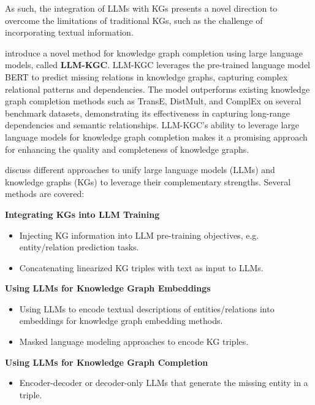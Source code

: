 \documentclass{article}
\begin{document}
As such, the integration of LLMs with KGs presents a novel direction to
overcome the limitations of traditional KGs, such as the challenge of
incorporating textual information.

\textbf{\cite{ullah2021llm-kgc}} introduce a novel method for knowledge graph
completion using large language models, called \textbf{LLM-KGC}. LLM-KGC
leverages the pre-trained language model BERT to predict missing relations in
knowledge graphs, capturing complex relational patterns and dependencies. The
model outperforms existing knowledge graph completion methods such as TransE,
DistMult, and ComplEx on several benchmark datasets, demonstrating its
effectiveness in capturing long-range dependencies and semantic relationships.
LLM-KGC's ability to leverage large language models for knowledge graph
completion makes it a promising approach for enhancing the quality and
completeness of knowledge graphs.

\textbf{\cite{pan2023unifying}} discuss different approaches to unify large
language models (LLMs) and knowledge graphs (KGs) to leverage their
complementary strengths. Several methods are covered:


\textbf{Integrating KGs into LLM Training}
\begin{itemize}
      \item Injecting KG information into LLM pre-training objectives, e.g.
            entity/relation prediction tasks.
      \item Concatenating linearized KG triples with text as input to LLMs.
\end{itemize}

\textbf{Using LLMs for Knowledge Graph Embeddings}
\begin{itemize}
      \item Using LLMs to encode textual descriptions of entities/relations
            into
            embeddings for knowledge graph embedding methods.
      \item Masked language modeling approaches to encode KG triples.
\end{itemize}

\textbf{Using LLMs for Knowledge Graph Completion}
\begin{itemize}
      \item Encoder-decoder or decoder-only LLMs that generate the missing
            entity
            in a triple.
\end{itemize}
\end{document}

